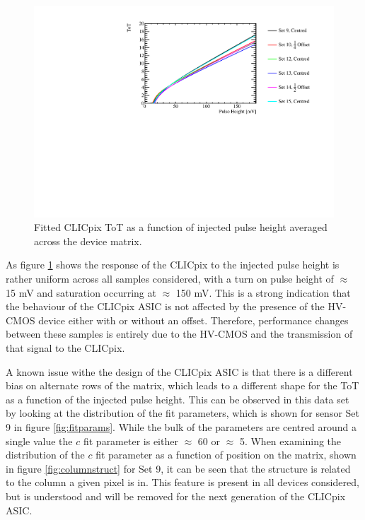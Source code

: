 \begin{figure}
\centering
\includegraphics[width=1.0\textwidth]{CLICdpVertex/Plots/TestPulseCalibration/FitParam/AverageToT_vs_InjectedPulseHeight.pdf}
\caption[Fitted CLICpix ToT as a function of injected pulse height averaged across the device matrix.]{Fitted CLICpix ToT as a function of injected pulse height averaged across the device matrix.}
\label{fig:testpulsemeanfit}
\end{figure}

As figure \ref{fig:testpulsemeanfit} shows the response of the CLICpix to the injected pulse height is rather uniform across all samples considered, with a turn on pulse height of $\approx$ 15 mV and saturation occurring at $\approx$ 150 mV.  This is a strong indication that the behaviour of the CLICpix ASIC is not affected by the presence of the HV-CMOS device either with or without an offset.  Therefore, performance changes between these samples is entirely due to the HV-CMOS and the transmission of that signal to the CLICpix.  

A known issue withe the design of the CLICpix ASIC is that there is a different bias on alternate rows of the matrix, which leads to a different shape for the ToT as a function of the injected pulse height.  This can be observed in this data set by looking at the distribution of the fit parameters, which is shown for sensor Set 9 in figure \ref{fig:fitparams}.  While the bulk of the parameters are centred around a single value the $c$ fit parameter is either $\approx$ 60 or $\approx$ 5.  When examining the distribution of the $c$ fit parameter as a function of position on the matrix, shown in figure \ref{fig:columnstruct} for Set 9, it can be seen that the structure is related to the column a given pixel is in.  This feature is present in all devices considered, but is understood and will be removed for the next generation of the CLICpix ASIC.

